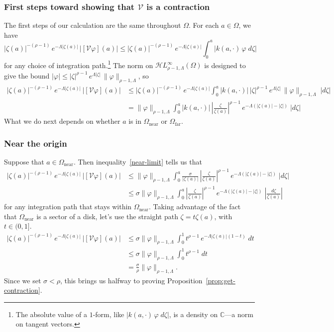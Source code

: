 \documentclass{article}
\theoremstyle{plain}
\newcommand{\C}{\mathbb{C}}
\newcommand{\singexp}[2]{\mathcal{H}L^\infty_{#1, #2}}
\newcommand{\volterra}{\mathcal{V}}
\newcommand{\domain}{\Omega}
\newcommand{\near}{\Omega_\text{near}}
\newcommand{\far}{\Omega_\text{far}}
\begin{document}
\subsubsection{First steps toward showing that $\volterra$ is a contraction}\label{first-steps}
The first steps of our calculation are the same throughout $\domain$. For each $a \in \domain$, we have
\[ |\zeta(a)|^{-(\rho-1)}\,e^{-\Lambda|\zeta(a)|}\,|[\volterra\varphi](a)| \le |\zeta(a)|^{-(\rho-1)}\,e^{-\Lambda|\zeta(a)|}  \int_0^a |k(a, \cdot)\,\varphi\;d\zeta| \]
for any choice of integration path.\footnote{The absolute value of a $1$-form, like $|k(a, \cdot)\,\varphi\;d\zeta|$, is a density on $\C$---a norm on tangent vectors.} The norm on $\singexp{\rho-1}{\Lambda}(\domain)$ is designed to give the bound $|\varphi| \le |\zeta|^{\rho-1}\,e^{\Lambda |\zeta|}\,\|\varphi\|_{\rho-1, \Lambda}$, so
\begin{align*}
|\zeta(a)|^{-(\rho-1)}\,e^{-\Lambda|\zeta(a)|}\,|[\volterra\varphi](a)| & \le |\zeta(a)|^{-(\rho-1)}\,e^{-\Lambda|\zeta(a)|}  \int_0^a |k(a, \cdot)|\,|\zeta|^{\rho-1}\,e^{\Lambda |\zeta|}\,\|\varphi\|_{\rho-1, \Lambda}\;|d\zeta| \\
& = \|\varphi\|_{\rho-1, \Lambda}  \int_0^a |k(a, \cdot)|\,\left|\frac{\zeta}{\zeta(a)}\right|^{\rho-1}\,e^{-\Lambda(|\zeta(a)| - |\zeta|)}\;|d\zeta|
\end{align*}
What we do next depends on whether $a$ is in $\near$ or $\far$.
\subsubsection{Near the origin}\label{near-bound}
Suppose that $a \in \near$. Then inequality~\eqref{near-limit} tells us that
\begin{align*}
|\zeta(a)|^{-(\rho-1)}\,e^{-\Lambda|\zeta(a)|}\,|[\volterra\varphi](a)| & \le
\|\varphi\|_{\rho-1, \Lambda}  \int_0^a \frac{\sigma}{|\zeta(a)|}\,\left|\frac{\zeta}{\zeta(a)}\right|^{\rho-1}\,e^{-\Lambda(|\zeta(a)| - |\zeta|)}\;|d\zeta| \\
& \le \sigma \|\varphi\|_{\rho-1, \Lambda}  \int_0^a \left|\frac{\zeta}{\zeta(a)}\right|^{\rho-1}\,e^{-\Lambda(|\zeta(a)| - |\zeta|)}\;\left|\frac{d\zeta}{\zeta(a)}\right|
\end{align*}
for any integration path that stays within $\near$. Taking advantage of the fact that $\near$ is a sector of a disk, let's use the straight path $\zeta = t \zeta(a)$, with $t \in (0, 1]$.
\begin{align*}
|\zeta(a)|^{-(\rho-1)}\,e^{-\Lambda|\zeta(a)|}\,|[\volterra\varphi](a)| & \le \sigma \|\varphi\|_{\rho-1, \Lambda} \int_0^1 t^{\rho-1}\,e^{-\Lambda |\zeta(a)|(1 - t)}\;dt \\
& \le \sigma \|\varphi\|_{\rho-1, \Lambda} \int_0^1 t^{\rho-1}\;dt \\
& = \frac{\sigma}{\rho} \|\varphi\|_{\rho-1, \Lambda}.
\end{align*}
Since we set $\sigma < \rho$, this brings us halfway to proving Proposition~\ref{prop:get-contraction}.
\end{document}

